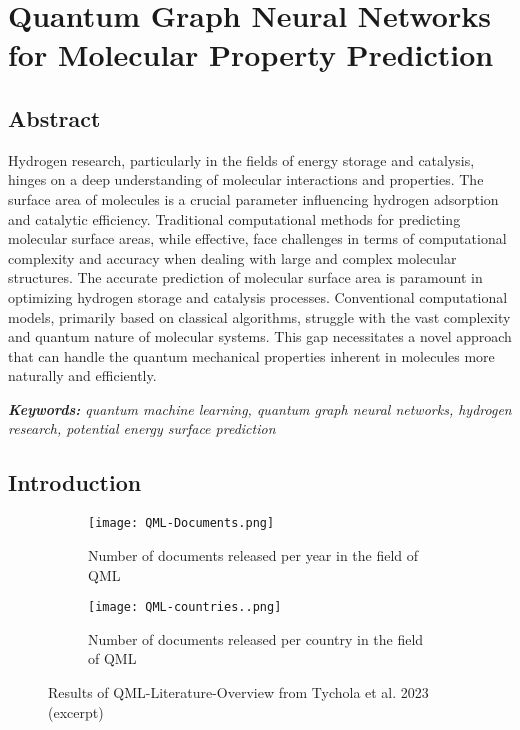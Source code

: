 \chapter{Quantum Graph Neural Networks for Molecular Property Prediction}

\section*{Abstract}

Hydrogen research, particularly in the fields of energy storage and catalysis, hinges on a deep understanding of molecular interactions and properties. The surface area of molecules is a crucial parameter influencing hydrogen adsorption and catalytic efficiency. Traditional computational methods for predicting molecular surface areas, while effective, face challenges in terms of computational complexity and accuracy when dealing with large and complex molecular structures. The accurate prediction of molecular surface area is paramount in optimizing hydrogen storage and catalysis processes. Conventional computational models, primarily based on classical algorithms, struggle with the vast complexity and quantum nature of molecular systems. This gap necessitates a novel approach that can handle the quantum mechanical properties inherent in molecules more naturally and efficiently.

\textit{\textbf{Keywords:} quantum machine learning, quantum graph neural networks, hydrogen research, potential energy surface prediction}

\section{Introduction}

\begin{figure}[h!]
    \begin{subfigure}{.5\textwidth}
     \captionsetup{justification=centering}
      \centering
      \texttt{[image: QML-Documents.png]}
      \caption{Number of documents released per year in the field of QML}
      \label{fig:sfig1}
    \end{subfigure}%
    \begin{subfigure}{.5\textwidth}
      \centering
      \captionsetup{justification=centering}
      \texttt{[image: QML-countries..png]}
      \caption{Number of documents released per country in the field of QML}
      \label{fig:sfig2}
    \end{subfigure}
    \caption[Results of QML-Literature-Overview from Tychola et al. 2023 (excerpt)]{\label{img:tychola} Results of QML-Literature-Overview from Tychola et al. 2023 \cite{Tychola_Kalampokas_Papakostas_2023} (excerpt)}
    \end{figure}

